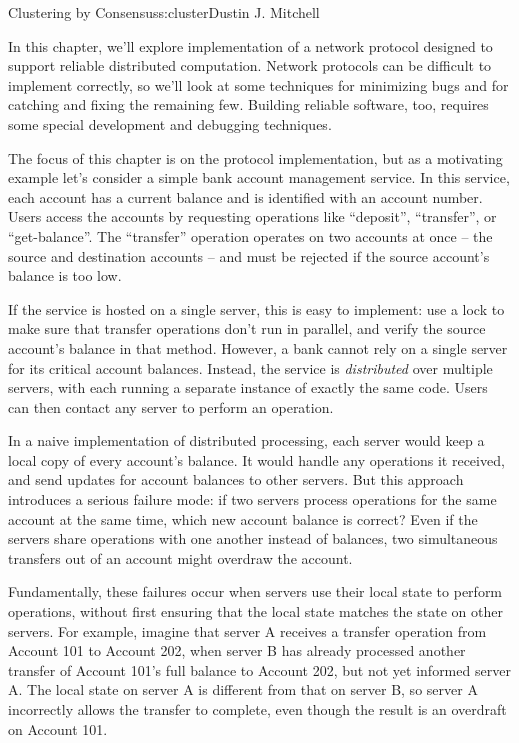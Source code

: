\begin{aosachapter}{Clustering by Consensus}{s:cluster}{Dustin J. Mitchell}

\label{introduction}

In this chapter, we'll explore implementation of a network protocol
designed to support reliable distributed computation. Network protocols
can be difficult to implement correctly, so we'll look at some
techniques for minimizing bugs and for catching and fixing the remaining
few. Building reliable software, too, requires some special development
and debugging techniques.

\label{motivating-example}

The focus of this chapter is on the protocol implementation, but as a
motivating example let's consider a simple bank account management
service. In this service, each account has a current balance and is
identified with an account number. Users access the accounts by
requesting operations like ``deposit'', ``transfer'', or
``get-balance''. The ``transfer'' operation operates on two accounts at
once -- the source and destination accounts -- and must be rejected if
the source account's balance is too low.

If the service is hosted on a single server, this is easy to implement:
use a lock to make sure that transfer operations don't run in parallel,
and verify the source account's balance in that method. However, a bank
cannot rely on a single server for its critical account balances.
Instead, the service is \emph{distributed} over multiple servers, with
each running a separate instance of exactly the same code. Users can
then contact any server to perform an operation.

In a naive implementation of distributed processing, each server would
keep a local copy of every account's balance. It would handle any
operations it received, and send updates for account balances to other
servers. But this approach introduces a serious failure mode: if two
servers process operations for the same account at the same time, which
new account balance is correct? Even if the servers share operations
with one another instead of balances, two simultaneous transfers out of
an account might overdraw the account.

Fundamentally, these failures occur when servers use their local state
to perform operations, without first ensuring that the local state
matches the state on other servers. For example, imagine that server A
receives a transfer operation from Account 101 to Account 202, when
server B has already processed another transfer of Account 101's full
balance to Account 202, but not yet informed server A. The local state
on server A is different from that on server B, so server A incorrectly
allows the transfer to complete, even though the result is an overdraft
on Account 101.


\end{aosachapter}

